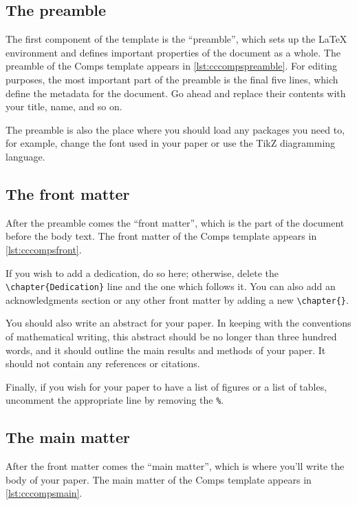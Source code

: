 \documentclass[twoside]{memoir}
\newcommand{\code}[1]{\texttt{#1}}
\begin{document}
\subsection{The preamble}
\label{s:preamble}
The first component of the template is the \enquote{preamble}, which sets up the \LaTeX{} environment and defines important properties of the document as a whole.
The preamble of the Comps template appears in \cref{lst:cccompspreamble}.
For editing purposes, the most important part of the preamble is the final five lines, which define the metadata for the document.
Go ahead and replace their contents with your title, name, and so on.



The preamble is also the place where you should load any packages you need to, for example, change the font used in your paper or use the TikZ diagramming language.

\subsection{The front matter}
\label{s:frontmatter}
After the preamble comes the \enquote{front matter}, which is the part of the document before the body text.
The front matter of the Comps template appears in \cref{lst:cccompsfront}.



If you wish to add a dedication, do so here; otherwise, delete the \code{\textbackslash{}chapter\{Dedication\}} line and the one which follows it.
You can also add an acknowledgments section or any other front matter by adding a new \code{\textbackslash{}chapter\{\}}.

You should also write an abstract for your paper.
In keeping with the conventions of mathematical writing, this abstract should be no longer than three hundred words, and it should outline the main results and methods of your paper.
It should not contain any references or citations.

Finally, if you wish for your paper to have a list of figures or a list of tables, uncomment the appropriate line by removing the \code{\%}.

\subsection{The main matter}
\label{s:mainmatter}
After the front matter comes the \enquote{main matter}, which is where you'll write the body of your paper.
The main matter of the Comps template appears in \cref{lst:cccompsmain}.
\end{document}
